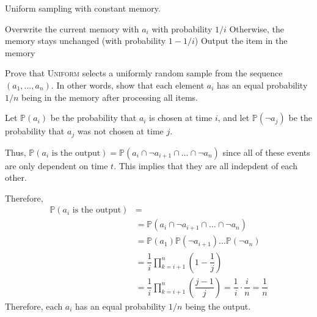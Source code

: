 \documentclass[12pt, letterpaper]{article}
\renewcommand{\P}{\mathbb{P}}
\renewcommand{\t}[1]{\text{#1}}
\begin{document}
\begin{problem}{Uniform sampling with constant memory.}
    \vspace{-20pt}
    \begin{minipage}{\linewidth}
        \begin{algorithm}[H]
          \begin{algorithmic}[1]
              \State Overwrite the current memory with $a_i$ with probability $1/i$ 
              \State Otherwise, the memory stays unchanged (with probability $1 - 1/i$)
            \EndFor
            \State Output the item in the memory
            \EndFunction
          \end{algorithmic}    
        \end{algorithm}
      \end{minipage}
      \vspace{5pt}

      Prove that \textsc{Uniform} selects a uniformly random sample from the sequence $(a_1, \ldots, a_n)$. In other words, show that each element $a_i$ has an equal probability $1/n$ being in the memory after processing all items.
\end{problem}
\begin{problemproof}
    Let $\P(a_i)$ be the probability that $a_i$ is chosen at time $i$, and let $\P(\lnot a_j)$ be the probability that $a_j$ was not chosen at time $j$.

    Thus, $\P(a_i \t{ is the output})=\P(a_i \cap \lnot a_{i+1} \cap \dots \cap \lnot a_n)$ since all of these events are only dependent on time $t$. This implies that they are all indepdent of each other.

    Therefore,
    \begin{align*}
      \P(a_i \t{ is the output})&=\\
      &=\P(a_i \cap \lnot a_{i+1} \cap \dots \cap \lnot a_n)\\
      &=\P(a_1) \P(\lnot a_{i+1}) \dots \P(\lnot a_n)\\
      &=\dfrac{1}{i}\prod_{k = i+1}^n \left( 1- \dfrac{1}{j} \right)\\
      &=\dfrac{1}{i}\prod_{k = i+1}^n \left( \dfrac{j-1}{j} \right)=\dfrac{1}{i}\cdot\dfrac{i}{n}=\dfrac{1}{n}
    \end{align*}
    Therefore, each $a_i$ has an equal probability $1/n$ being the output.
\end{problemproof}
\end{document}
